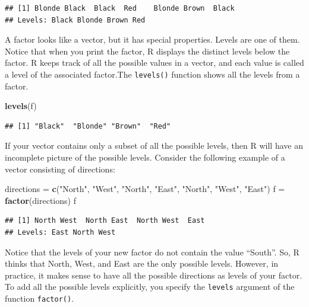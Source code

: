 \documentclass[
]{book}
\newenvironment{Shaded}{\begin{snugshade}}{\end{snugshade}}
\newcommand{\KeywordTok}[1]{\textcolor[rgb]{0.13,0.29,0.53}{\textbf{#1}}}
\newcommand{\NormalTok}[1]{#1}
\newcommand{\StringTok}[1]{\textcolor[rgb]{0.31,0.60,0.02}{#1}}
\begin{document}
\begin{verbatim}
## [1] Blonde Black  Black  Red    Blonde Brown  Black 
## Levels: Black Blonde Brown Red
\end{verbatim}

A factor looks like a vector, but it has special properties. Levels are one of them. Notice that when you print the factor, R displays the distinct levels below the factor. R keeps track of all the possible values in a vector, and each value is called a level of the associated factor.The \texttt{levels()} function shows all the levels from a factor.

\begin{Shaded}
\begin{Highlighting}[]
\KeywordTok{levels}\NormalTok{(f)}
\end{Highlighting}
\end{Shaded}

\begin{verbatim}
## [1] "Black"  "Blonde" "Brown"  "Red"
\end{verbatim}

If your vector contains only a subset of all the possible levels, then R will have an incomplete picture of the possible levels. Consider the following example of a vector consisting of directions:

\begin{Shaded}
\begin{Highlighting}[]
\NormalTok{directions =}\StringTok{ }\KeywordTok{c}\NormalTok{(}\StringTok{"North"}\NormalTok{, }\StringTok{"West"}\NormalTok{, }\StringTok{"North"}\NormalTok{, }\StringTok{"East"}\NormalTok{, }\StringTok{"North"}\NormalTok{, }\StringTok{"West"}\NormalTok{, }\StringTok{"East"}\NormalTok{)}
\NormalTok{f =}\StringTok{ }\KeywordTok{factor}\NormalTok{(directions)}
\NormalTok{f}
\end{Highlighting}
\end{Shaded}

\begin{verbatim}
## [1] North West  North East  North West  East 
## Levels: East North West
\end{verbatim}

Notice that the levels of your new factor do not contain the value ``South''. So, R thinks that North, West, and East are the only possible levels. However, in practice, it makes sense to have all the possible directions as levels of your factor. To add all the possible levels explicitly, you specify the \texttt{levels} argument of the function \texttt{factor()}.
\end{document}

